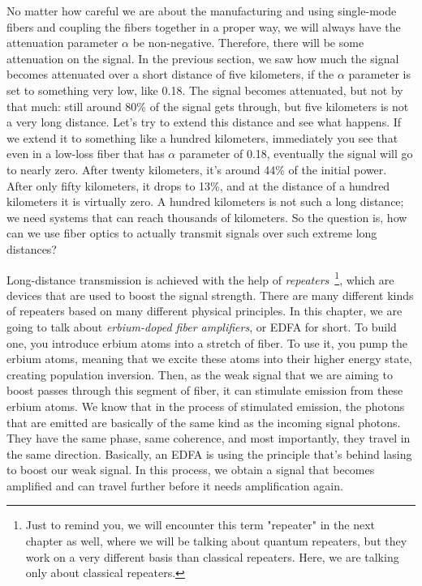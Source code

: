 No matter how careful we are about the manufacturing and using single-mode fibers and coupling the fibers together in a proper way, we will always have the attenuation parameter $\alpha$ be non-negative. Therefore, there will be some attenuation on the signal. In the previous section, we saw how much the signal becomes attenuated over a short distance of five kilometers, if the $\alpha$ parameter is set to something very low, like 0.18. The signal becomes attenuated, but not by that much: still around 80\% of the signal gets through, but five kilometers is not a very long distance. Let's try to extend this distance and see what happens. If we extend it to something like a hundred kilometers, immediately you see that even in a low-loss fiber that has $\alpha$ parameter of 0.18, eventually the signal will go to nearly zero. After twenty kilometers, it's around 44\% of the initial power. After only fifty kilometers, it drops to 13\%, and at the distance of a hundred kilometers it is virtually zero. A hundred kilometers is not such a long distance; we need systems that can reach thousands of kilometers. So the question is, how can we use fiber optics to actually transmit signals over such extreme long distances?

Long-distance transmission is achieved with the help of \emph{repeaters}~\footnote{Just to remind you, we will encounter this term "repeater" in the next chapter as well, where we will be talking about quantum repeaters, but they work on a very different basis than classical repeaters. Here, we are talking only about classical repeaters.}, which are devices that are used to boost the signal strength. There are many different kinds of repeaters based on many different physical principles. In this chapter, we are going to talk about \emph{erbium-doped fiber amplifiers}, or EDFA for short. To build one, you introduce erbium atoms into a stretch of fiber. To use it, you pump the erbium atoms, meaning that we excite these atoms into their higher energy state, creating population inversion. Then, as the weak signal that we are aiming to boost passes through this segment of fiber, it can stimulate emission from these erbium atoms. We know that in the process of stimulated emission, the photons that are emitted are basically of the same kind as the incoming signal photons. They have the same phase, same coherence, and most importantly, they travel in the same direction. Basically, an EDFA is using the principle that's behind lasing to boost our weak signal. In this process, we obtain a signal that becomes amplified and can travel further before it needs amplification again.

